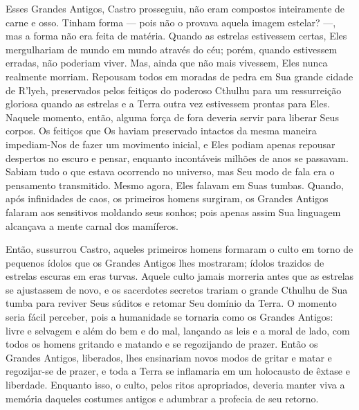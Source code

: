 Esses Grandes Antigos, Castro prosseguiu, não eram compostos
inteiramente de carne e osso. Tinham forma --- pois não o provava aquela
imagem estelar? ---, mas a forma não era feita de matéria. Quando as
estrelas estivessem certas, Eles mergulhariam de mundo em mundo através
do céu; porém, quando estivessem erradas, não poderiam viver. Mas, ainda que
não mais vivessem, Eles nunca realmente morriam. Repousam todos em
moradas de pedra em Sua grande cidade de R'lyeh, preservados pelos
feitiços do poderoso Cthulhu para um ressurreição gloriosa quando as
estrelas e a Terra outra vez estivessem prontas para Eles. Naquele
momento, então, alguma força de fora deveria servir para liberar Seus
corpos. Os feitiços que Os haviam preservado intactos da mesma maneira
impediam-Nos de fazer um movimento inicial, e Eles podiam apenas
repousar despertos no escuro e pensar, enquanto incontáveis milhões de
anos se passavam. Sabiam tudo o que estava ocorrendo no universo, mas
Seu modo de fala era o pensamento transmitido. Mesmo agora, Eles falavam
em Suas tumbas. Quando, após infinidades de caos, os primeiros homens
surgiram, os Grandes Antigos falaram aos sensitivos moldando seus
sonhos; pois apenas assim Sua linguagem alcançava a mente carnal dos
mamíferos.

Então, sussurrou Castro, aqueles primeiros homens formaram o culto em
torno de pequenos ídolos que os Grandes Antigos lhes mostraram; ídolos
trazidos de estrelas escuras em eras turvas. Aquele culto jamais
morreria antes que as estrelas se ajustassem de novo, e os sacerdotes
secretos trariam o grande Cthulhu de Sua tumba para reviver Seus súditos
e retomar Seu domínio da Terra. O momento seria fácil perceber, pois a
humanidade se tornaria como os Grandes Antigos: livre e selvagem e além
do bem e do mal, lançando as leis e a moral de lado, com todos os homens
gritando e matando e se regozijando de prazer. Então os Grandes Antigos,
liberados, lhes ensinariam novos modos de gritar e matar e
regozijar-se de prazer, e toda a Terra se inflamaria em um holocausto de
êxtase e liberdade. Enquanto isso, o culto, pelos ritos apropriados,
deveria manter viva a memória daqueles costumes antigos e adumbrar a
profecia de seu retorno.

